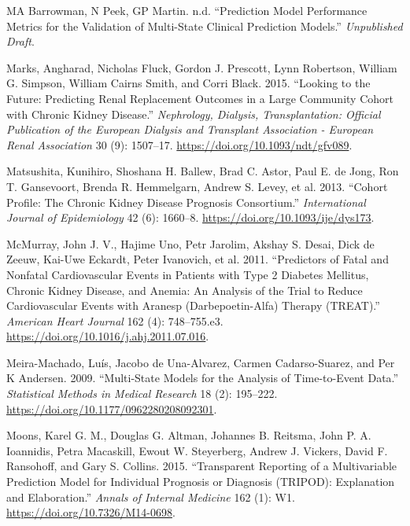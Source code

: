 \documentclass[
]{article}
\newlength{\cslhangindent}
\newenvironment{cslreferences}%
  {\setlength{\parindent}{0pt}%
  \everypar{\setlength{\hangindent}{\cslhangindent}}\ignorespaces}%
  {\par}
\begin{document}
\begin{cslreferences}
\leavevmode\hypertarget{ref-chap-performance-metrics}{}%
MA Barrowman, N Peek, GP Martin. n.d. ``Prediction Model Performance Metrics for the Validation of Multi-State Clinical Prediction Models.'' \emph{Unpublished Draft}.

\leavevmode\hypertarget{ref-marks_looking_2015}{}%
Marks, Angharad, Nicholas Fluck, Gordon J. Prescott, Lynn Robertson, William G. Simpson, William Cairns Smith, and Corri Black. 2015. ``Looking to the Future: Predicting Renal Replacement Outcomes in a Large Community Cohort with Chronic Kidney Disease.'' \emph{Nephrology, Dialysis, Transplantation: Official Publication of the European Dialysis and Transplant Association - European Renal Association} 30 (9): 1507--17. \url{https://doi.org/10.1093/ndt/gfv089}.

\leavevmode\hypertarget{ref-matsushita_cohort_2013}{}%
Matsushita, Kunihiro, Shoshana H. Ballew, Brad C. Astor, Paul E. de Jong, Ron T. Gansevoort, Brenda R. Hemmelgarn, Andrew S. Levey, et al. 2013. ``Cohort Profile: The Chronic Kidney Disease Prognosis Consortium.'' \emph{International Journal of Epidemiology} 42 (6): 1660--8. \url{https://doi.org/10.1093/ije/dys173}.

\leavevmode\hypertarget{ref-mcmurray_predictors_2011}{}%
McMurray, John J. V., Hajime Uno, Petr Jarolim, Akshay S. Desai, Dick de Zeeuw, Kai-Uwe Eckardt, Peter Ivanovich, et al. 2011. ``Predictors of Fatal and Nonfatal Cardiovascular Events in Patients with Type 2 Diabetes Mellitus, Chronic Kidney Disease, and Anemia: An Analysis of the Trial to Reduce Cardiovascular Events with Aranesp (Darbepoetin-Alfa) Therapy (TREAT).'' \emph{American Heart Journal} 162 (4): 748--755.e3. \url{https://doi.org/10.1016/j.ahj.2011.07.016}.

\leavevmode\hypertarget{ref-meira-machado_multi-state_2009}{}%
Meira-Machado, Luís, Jacobo de Una-Alvarez, Carmen Cadarso-Suarez, and Per K Andersen. 2009. ``Multi-State Models for the Analysis of Time-to-Event Data.'' \emph{Statistical Methods in Medical Research} 18 (2): 195--222. \url{https://doi.org/10.1177/0962280208092301}.

\leavevmode\hypertarget{ref-moons_transparent_2015}{}%
Moons, Karel G. M., Douglas G. Altman, Johannes B. Reitsma, John P. A. Ioannidis, Petra Macaskill, Ewout W. Steyerberg, Andrew J. Vickers, David F. Ransohoff, and Gary S. Collins. 2015. ``Transparent Reporting of a Multivariable Prediction Model for Individual Prognosis or Diagnosis (TRIPOD): Explanation and Elaboration.'' \emph{Annals of Internal Medicine} 162 (1): W1. \url{https://doi.org/10.7326/M14-0698}.


\end{cslreferences}
\end{document}
